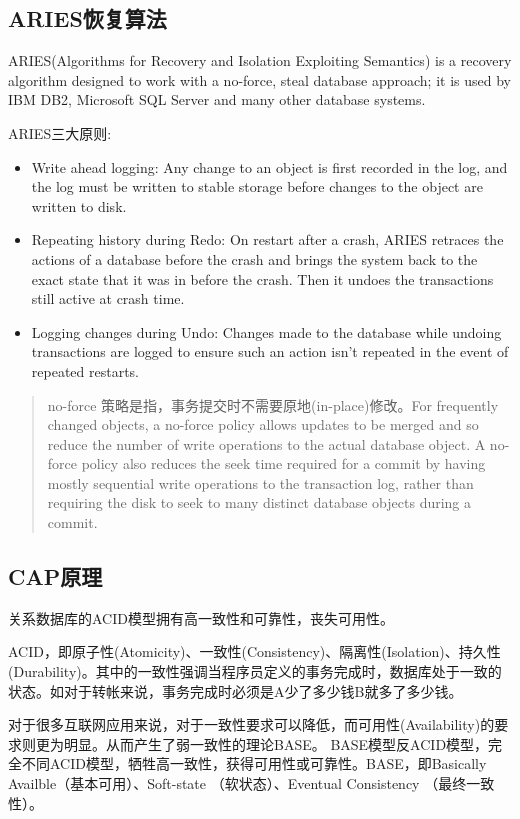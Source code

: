 \subsection{ARIES恢复算法}

ARIES(Algorithms for Recovery and Isolation Exploiting Semantics) is a recovery algorithm designed to work with a no-force, steal database approach; it is used by IBM DB2, Microsoft SQL Server and many other database systems.

ARIES三大原则:
\begin{itemize}
\item   Write ahead logging: Any change to an object is first recorded in the log, and the log must be written to stable storage before changes to the object are written to disk.
\item   Repeating history during Redo: On restart after a crash, ARIES retraces the actions of a database before the crash and brings the system back to the exact state that it was in before the crash. Then it undoes the transactions still active at crash time.
\item   Logging changes during Undo: Changes made to the database while undoing transactions are logged to ensure such an action isn't repeated in the event of repeated restarts.
\end{itemize}


\begin{quotation}
no-force 策略是指，事务提交时不需要原地(in-place)修改。For frequently changed objects, a no-force policy allows updates to be merged and so reduce the number of write operations to the actual database object. A no-force policy also reduces the seek time required for a commit by having mostly sequential write operations to the transaction log, rather than requiring the disk to seek to many distinct database objects during a commit.
\end{quotation}

\subsection{CAP原理}
关系数据库的ACID模型拥有高一致性和可靠性，丧失可用性。

ACID，即原子性(Atomicity)、一致性(Consistency)、隔离性(Isolation)、持久性(Durability)。其中的一致性强调当程序员定义的事务完成时，数据库处于一致的状态。如对于转帐来说，事务完成时必须是A少了多少钱B就多了多少钱。
 
对于很多互联网应用来说，对于一致性要求可以降低，而可用性(Availability)的要求则更为明显。从而产生了弱一致性的理论BASE。 BASE模型反ACID模型，完全不同ACID模型，牺牲高一致性，获得可用性或可靠性。BASE，即Basically Availble（基本可用）、Soft-state （软状态）、Eventual Consistency （最终一致性）。

